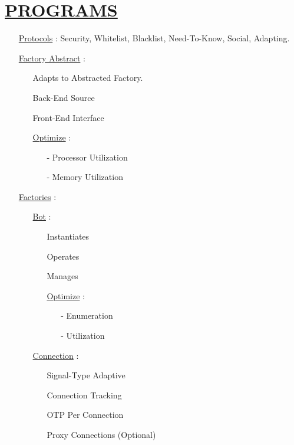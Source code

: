 \documentclass[11pt]{article}
\begin{document}
\section*{\ul{PROGRAMS}}
\begin{enumerate}
	\item[] \ul{Protocols} : Security, Whitelist, Blacklist, Need-To-Know, Social, Adapting.
	
	\item[] \ul{Factory Abstract} :
	\begin{enumerate}
		
		\item[] Adapts to Abstracted Factory.
		\item[] Back-End Source
		\item[] Front-End Interface
		
		\item[] \ul{Optimize}  :
		\begin{enumerate}
			\item[-] Processor Utilization
			\item[-] Memory Utilization
		\end{enumerate}
	\end{enumerate}

	\item[] \ul{Factories} :
	\begin{enumerate}
		
		\item[] \ul{Bot} :
		\begin{enumerate}
			\item[] Instantiates
			\item[] Operates
			\item[] Manages
			
			\item[] \ul{Optimize}  :
			\begin{enumerate}
				\item[-] Enumeration
				\item[-] Utilization
			\end{enumerate}
		\end{enumerate}
	
		\item[] \ul{Connection} :
		\begin{enumerate}
			\item[] Signal-Type Adaptive
			\item[] Connection Tracking
			\item[] OTP Per Connection
			\item[] Proxy Connections (Optional)
		\end{enumerate}


\end{enumerate}
\end{enumerate}
\end{document}
